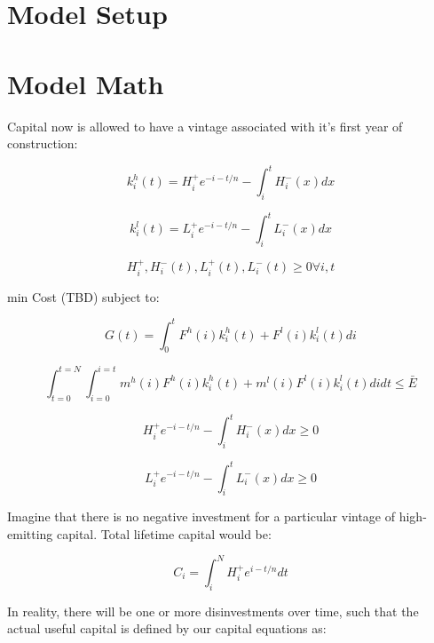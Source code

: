 \documentclass[singlespace]{easychithesis}
\begin{document}
\section{Model Setup}

\section{Model Math}

Capital now is allowed to have a vintage associated with it's first year of construction:

\begin{equation}
k_i^h(t) = H_i^+ e^{-i-t/n} - \int_i^t H^-_i(x)dx
\end{equation}

\begin{equation}
k_i^l(t) = L_i^+ e^{-i-t/n} - \int_i^t L^-_i(x)dx
\end{equation}

\begin{equation}
H^+_i, H^-_i(t), L^+_i(t), L^-_i(t) \geq 0 \forall i, t
\end{equation}

min Cost (TBD) subject to:

\begin{equation}
G(t) = \int_0^t F^h(i)k_i^h(t) + F^l(i)k_i^l(t) di
\end{equation}

\begin{equation}
\int_{t=0}^{t=N}\int_{i=0}^{i=t} m^h(i)F^h(i)k_i^h(t) + m^l(i)F^l(i)k_i^l(t) di dt \leq \bar{E}
\end{equation}

\begin{equation}
H_i^+ e^{-i-t/n} - \int_i^t H^-_i(x)dx \geq 0
\end{equation}

\begin{equation}
L_i^+ e^{-i-t/n} - \int_i^t L^-_i(x)dx \geq 0
\end{equation}



Imagine that there is no negative investment for a particular vintage of high-emitting capital. Total lifetime capital would be:

\begin{equation}
C_i = \int_i^N H^+_i e^{i-t/n}dt
\end{equation}

In reality, there will be one or more disinvestments over time, such that the actual useful capital is defined by our capital equations as:
\end{document}
